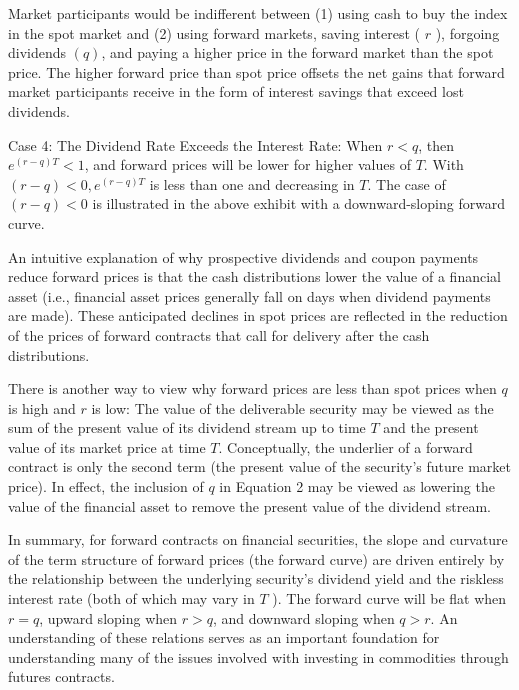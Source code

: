 \documentclass[11pt]{article}
\begin{document}
Market participants would be indifferent between (1) using cash to buy the index in the spot market and (2) using forward markets, saving interest ( $r$ ), forgoing dividends $(q)$, and paying a higher price in the forward market than the spot price. The higher forward price than spot price offsets the net gains that forward market participants receive in the form of interest savings that exceed lost dividends.

Case 4: The Dividend Rate Exceeds the Interest Rate: When $r<q$, then $e^{(r-q) T}<1$, and forward prices will be lower for higher values of $T$. With $(r-q)<0, e^{(r-q) T}$ is less than one and decreasing in $T$. The case of $(r-q)<0$ is illustrated in the above exhibit with a downward-sloping forward curve.

An intuitive explanation of why prospective dividends and coupon payments reduce forward prices is that the cash distributions lower the value of a financial asset (i.e., financial asset prices generally fall on days when dividend payments are made). These anticipated declines in spot prices are reflected in the reduction of the prices of forward contracts that call for delivery after the cash distributions.

There is another way to view why forward prices are less than spot prices when $q$ is high and $r$ is low: The value of the deliverable security may be viewed as the sum of the present value of its dividend stream up to time $T$ and the present value of its market price at time $T$. Conceptually, the underlier of a forward contract is only the second term (the present value of the security's future market price). In effect, the inclusion of $q$ in Equation 2 may be viewed as lowering the value of the financial asset to remove the present value of the dividend stream.

In summary, for forward contracts on financial securities, the slope and curvature of the term structure of forward prices (the forward curve) are driven entirely by the relationship between the underlying security's dividend yield and the riskless interest rate (both of which may vary in $T$ ). The forward curve will be flat when $r=q$, upward sloping when $r>q$, and downward sloping when $q>r$. An understanding of these relations serves as an important foundation for understanding many of the issues involved with investing in commodities through futures contracts.
\end{document}
